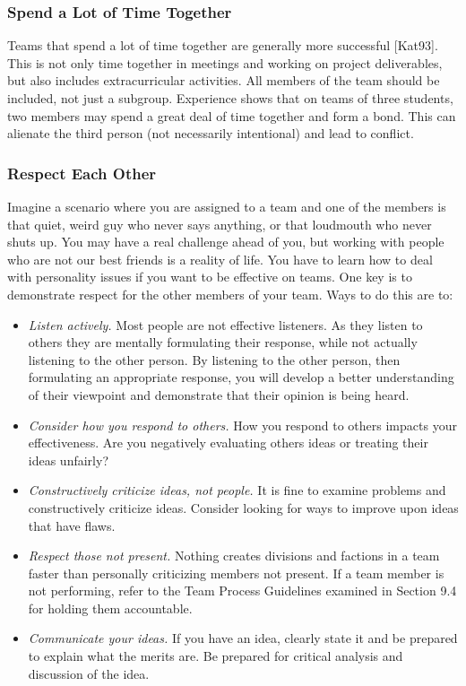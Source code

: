 \subsubsection{Spend a Lot of Time
Together}\label{spend-a-lot-of-time-together}

Teams that spend a lot of time together are generally more successful
{[}Kat93{]}. This is not only time together in meetings and working on
project deliverables, but also includes extracurricular activities. All
members of the team should be included, not just a subgroup. Experience
shows that on teams of three students, two members may spend a great
deal of time together and form a bond. This can alienate the third
person (not necessarily intentional) and lead to conflict.

\subsubsection{Respect Each Other}\label{respect-each-other}

Imagine a scenario where you are assigned to a team and one of the
members is that quiet, weird guy who never says anything, or that
loudmouth who never shuts up. You may have a real challenge ahead of
you, but working with people who are not our best friends is a reality
of life. You have to learn how to deal with personality issues if you
want to be effective on teams. One key is to demonstrate respect for the
other members of your team. Ways to do this are to:

\begin{itemize}
\item
  \emph{Listen actively.} Most people are not effective listeners. As
  they listen to others they are mentally formulating their response,
  while not actually listening to the other person. By listening to the
  other person, then formulating an appropriate response, you will
  develop a better understanding of their viewpoint and demonstrate that
  their opinion is being heard.
\item
  \emph{Consider how you respond to others.} How you respond to others
  impacts your effectiveness. Are you negatively evaluating others ideas
  or treating their ideas unfairly?
\item
  \emph{Constructively criticize ideas, not people.} It is fine to
  examine problems and constructively criticize ideas. Consider looking
  for ways to improve upon ideas that have flaws.
\item
  \emph{Respect those not present.} Nothing creates divisions and
  factions in a team faster than personally criticizing members not
  present. If a team member is not performing, refer to the Team Process
  Guidelines examined in Section 9.4 for holding them accountable.
\item
  \emph{Communicate your ideas.} If you have an idea, clearly state it
  and be prepared to explain what the merits are. Be prepared for
  critical analysis and discussion of the idea.
\end{itemize}

